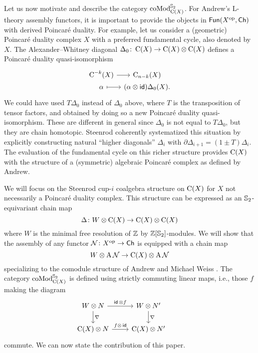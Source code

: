 Let us now motivate and describe the category $\operatorname{coMod}^{\mathbb{S}_2}_{\operatorname{C}(X)}$.
For Andrew's L-theory assembly functors, it is important to provide the objects in $\mathsf{Fun}(X^{\mathrm{op}}, \mathsf{Ch})$ with derived Poincar\'e duality.
For example, let us consider a (geometric) Poincar\'e duality complex $X$ with a preferred fundamental cycle, also denoted by $X$.
The Alexander--Whitney diagonal $\Delta_0 \colon \operatorname{C}(X) \to \operatorname{C}(X) \otimes \operatorname{C}(X)$ defines a Poincar\'e duality quasi-isomorphism
\[
\begin{tikzcd}[column sep=tiny,row sep=0]
	\cochains^{-k}(X) \arrow[r] & \chains_{n-k}(X) \\
	\alpha \arrow[r,mapsto] & (\alpha \ot \id)\Delta_0(X).
\end{tikzcd}
\]
We could have used $T\Delta_0$ instead of $\Delta_0$ above, where $T$ is the transposition of tensor factors, and obtained by doing so a new Poincar\'e duality quasi-isomorphism.
These are different in general since $\Delta_0$ is not equal to $T \Delta_0$, but they are chain homotopic.
Steenrod \cite{steenrod1947products} coherently systematized this situation by explicitly constructing natural ``higher diagonals'' $\Delta_i$ with $\partial \Delta_{i+1} = (1 \pm T) \Delta_i$.
The evaluation of the fundamental cycle on this richer structure provides $\operatorname{C}(X)$ with the structure of a (symmetric) algebraic Poincar\'e complex as defined by Andrew.

We will focus on the Steenrod cup-$i$ coalgebra structure on $\operatorname{C}(X)$ for $X$ not necessarily a Poincar\'e duality complex.
This structure can be expressed as an $\mathbb{S}_2$-equivariant chain map
\[
\Delta \colon W \otimes \operatorname{C}(X) \to \operatorname{C}(X) \otimes \operatorname{C}(X)
\]
where $W$ is the minimal free resolution of $\mathbb{Z}$ by $\mathbb{Z}[\mathbb{S}_2]$-modules.
We will show that the assembly of any functor $\mathcal{N} \colon X^{\mathrm{op}} \to \mathsf{Ch}$ is equipped with a chain map
\[
W \otimes \operatorname{A} \mathcal{N} \to \operatorname{C}(X) \otimes \operatorname{A} \mathcal{N}
\]
specializing to the comodule structure of Andrew and Michael Weiss \cite[Proposition 5.3]{ranicki1990assembly}.
The category $\operatorname{coMod}^{\mathbb{S}_2}_{\operatorname{C}(X)}$ is defined using strictly commuting linear maps, i.e., those $f$ making the diagram
\[
\begin{tikzcd}
	W \ot N \arrow[d, "\nabla"] \arrow[r, "\id\, \ot f"] &
	W \ot N' \arrow[d, "\nabla"] & \\
	\chains(X) \ot N \arrow[r, "f \ot\, \id"] &
	\chains(X) \ot N'
\end{tikzcd}
\]
commute.
We can now state the contribution of this paper.

